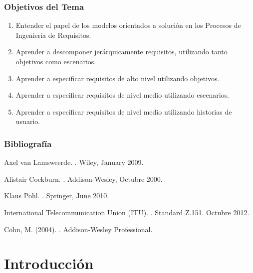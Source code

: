 \documentclass[slidestop,xcolor=pst,dvips,blue]{beamer}
\begin{document}
\begin{frame}[c]
    \frametitle{Objetivos del Tema}
    \begin{enumerate}[<+->]
         \item Entender el papel de los modelos orientados a solución en los Procesos de Ingeniería de Requisitos.
         \item Aprender a descomponer jerárquicamente requisitos, utilizando tanto objetivos como escenarios.
         \item Aprender a especificar requisitos de alto nivel utilizando objetivos.
         \item Aprender a especificar requisitos de nivel medio utilizando escenarios.
         \item Aprender a especificar requisitos de nivel medio utilizando historias de usuario.
    \end{enumerate}
\end{frame}

\begin{frame}[allowframebreaks,t]
    \frametitle{Bibliografía}
    \begin{thebibliography}{1}
Axel van Lamsweerde.
.
\newblock Wiley, January 2009.

Alistair Cockburn.
.
\newblock Addison-Wesley, Octubre 2000.

Klaus Pohl.
.
\newblock Springer, June 2010.

International Telecommunication Union (ITU).
.
\newblock Standard Z.151. Octubre 2012.

Cohn, M. (2004).
.
\newblock Addison-Wesley Professional.
\end{thebibliography}
\end{frame}

\section{Introducción}
\end{document}
